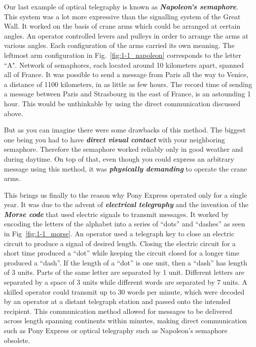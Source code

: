 Our last example of optical telegraphy is known as \textit{\textbf{Napoleon's semaphore}}.
This system was a lot more expressive than the signalling system of the Great Wall.
It worked on the basis of crane arms which could be arranged at certain angles.
An operator controlled levers and pulleys in order to arrange the arms at various angles. Each configuration of the arms carried its own meaning.
The leftmost arm configuration in Fig.~\ref{fig:1-1_napoleon} corresponds to the letter ``A".
Network of semaphores, each located around 10 kilometers apart, spanned all of France.
It was possible to send a message from Paris all the way to Venice, a distance of 1100 kilometers, in as little as few hours.
The record time of sending a message between Paris and Strasbourg in the east of France, is an astounding 1 hour.
This would be unthinkable by using the direct communication discussed above.

But as you can imagine there were some drawbacks of this method.
The biggest one being you had to have \textit{\textbf{direct visual contact}} with your neighboring semaphore.
Therefore the semaphore worked reliably only in good weather and during daytime.
On top of that, even though you could express an arbitrary message using this method, it was \textit{\textbf{physically demanding}} to operate the crane arms.

This brings us finally to the reason why Pony Express operated only for a single year.
It was due to the advent of \textit{\textbf{electrical telegraphy}} and the invention of the \textit{\textbf{Morse code}} that used electric signals to transmit messages.
It worked by encoding the letters of the alphabet into a series of ``dots'' and ``dashes'' as seen in Fig~\ref{fig:1-1_morse}.
An operator used a telegraph key to close an electric circuit to produce a signal of desired length.
Closing the electric circuit for a short time produced a ``dot'' while keeping the circuit closed for a longer time produced a ``dash''.
If the length of a ``dot'' is one unit, then a ``dash'' has length of 3 units.
Parts of the same letter are separated by 1 unit.
Different letters are separated by a space of 3 units while different words are separated by 7 units.
A skilled operator could transmit up to 30 words per minute, which were decoded by an operator at a distant telegraph station and passed onto the intended recipient.
This communication method allowed for messages to be delivered across length spanning continents within minutes, making direct communication such as Pony Express or optical telegraphy such as Napoleon's semaphore obsolete.

